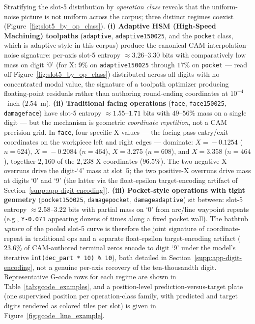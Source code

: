 \documentclass[11pt,a4paper]{article}
\begin{document}
Stratifying the slot-5 distribution by \emph{operation class} reveals that the uniform-noise picture is not uniform across the corpus; three distinct regimes coexist (Figure~\ref{fig:slot5_by_op_class}). \textbf{(i) Adaptive HSM (High-Speed Machining) toolpaths} (\texttt{adaptive}, \texttt{adaptive150025}, and the \texttt{pocket} class, which is adaptive-style in this corpus) produce the canonical CAM-interpolation-noise signature: per-axis slot-5 entropy $\approx 3.26$--$3.30$ bits with comparatively low mass on digit `0' (for X: $9\%$ on \texttt{adaptive150025} through $17\%$ on \texttt{pocket} --- read off Figure~\ref{fig:slot5_by_op_class}) distributed across all digits with no concentrated modal value, the signature of a toolpath optimizer producing floating-point residuals rather than authoring round-ending coordinates at $10^{-4}$~inch ($2.54$~\textmu m). \textbf{(ii) Traditional facing operations} (\texttt{face}, \texttt{face150025}, \texttt{damageface}) have slot-5 entropy $\approx 1.55$--$1.71$ bits with $49$--$56\%$ mass on a single digit --- but the mechanism is geometric \emph{coordinate repetition}, not a CAM precision grid. In \texttt{face}, four specific X values --- the facing-pass entry/exit coordinates on the workpiece left and right edges --- dominate: $X\!=\!-0.1254$ ($n\!=\!624$), $X\!=\!-0.2084$ ($n\!=\!464$), $X\!=\!3.275$ ($n\!=\!608$), and $X\!=\!3.358$ ($n\!=\!464$), together $2{,}160$ of the $2{,}238$ X-coordinates ($96.5\%$). The two negative-X overruns drive the digit-`4' mass at slot~5; the two positive-X overruns drive mass at digits `0' and `9' (the latter via the float-epsilon target-encoding artifact of Section~\ref{supp:app-digit-encoding}). \textbf{(iii) Pocket-style operations with tight geometry} (\texttt{pocket150025}, \texttt{damagepocket}, \texttt{damageadaptive}) sit between: slot-5 entropy $\approx 2.58$--$3.22$ bits with partial mass on `0' from arc/line waypoint repeats (e.g., \texttt{Y-0.071} appearing dozens of times along a fixed pocket wall). The bathtub \emph{upturn} of the pooled slot-5 curve is therefore the joint signature of coordinate-repeat in traditional ops and a separate float-epsilon target-encoding artifact ($23.6\%$ of CAM-authored terminal zeros encode to digit `9' under the model's iterative \texttt{int(dec\_part * 10) \% 10}), both detailed in Section~\ref{supp:app-digit-encoding}, not a genuine per-axis recovery of the ten-thousandth digit. Representative G-code rows for each regime are shown in Table~\ref{tab:gcode_examples}, and a position-level prediction-versus-target plate (one supervised position per operation-class family, with predicted and target digits rendered as colored tiles per slot) is given in Figure~\ref{fig:gcode_line_example}.
\end{document}
